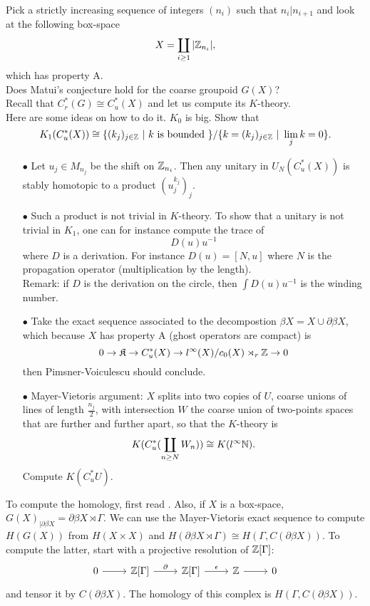 Pick a strictly increasing sequence of integers $(n_i)$ such that $n_i | n_{i+1}$ and look at the following box-space
\[X = \coprod_{i\geq 1} | \mathbb Z_{n_i}|,\]
which has property A.\\

Does Matui's conjecture hold for the coarse groupoid $G(X)$?\\ 

Recall that $C^*_r(G) \cong C_u^*(X)$ and let us compute its $K$-theory. \\

Here are some ideas on how to do it. $K_0$ is big. Show that 
\[K_1(C^*_u(X)) \cong \{ (k_j)_{j\in \Z} \ |\ k \text{ is bounded } \} /  \{ k=(k_j)_{j\in \Z} \ |\ \lim_j k =0 \}.\]
\begin{itemize}
\item[$\bullet$] Let $u_j\in M_{n_j}$ be the shift on $\mathbb Z_{n_i}$. Then any unitary in $U_N(C^*_u(X))$ is stably homotopic to a product $(u_j^{k_j})_j$.
\item[$\bullet$] Such a product is not trivial in $K$-theory. To show that a unitary is not trivial in $K_1$, one can for instance compute the trace of 
\[D(u)u^{-1}\]
where $D$ is a derivation. For instance $D(u)= [N,u]$ where $N$ is the propagation operator (multiplication by the length).\\
Remark: if $D$ is the derivation on the circle, then $\int D(u)u^{-1}$ is the winding number.  
\item[$\bullet$] Take the exact sequence associated to the decompostion $\beta X = X \cup \partial \beta X$, which because $X$ has property A (ghost operators are compact) is
\[0\rightarrow \mathfrak K \rightarrow C_u^*(X) \rightarrow l^{\infty}(X)/c_{0}(X) \rtimes_r \mathbb Z \rightarrow 0\]
then Pimsner-Voiculescu should conclude. 
\item[$\bullet$] Mayer-Vietoris argument: $X$ splits into two copies of $U$, coarse unions of lines of length $\frac{n_j}{2}$, with intersection $W$ the coarse union of two-points spaces that are further and further apart, so that the $K$-theory is 
\[K(C^*_u(\coprod_{n\geq N} W_n)) \cong K(l^\infty \mathbb N).\]
Compute $K(C_u^*U)$.
\end{itemize} 

To compute the homology, first read \cite{MatuiSurvey}. Also, if $X$ is a box-space, $G(X)_{|\partial \beta X}= \partial \beta X \rtimes \Gamma$. We can use the Mayer-Vietoris exact sequence to compute $H(G(X))$ from $H(X\times X)$ and $H(\partial \beta X \rtimes \Gamma)\cong H(\Gamma, C(\partial\beta X))$. To compute the latter, start with a projective resolution of $\mathbb Z [\Gamma]$: 
\[\begin{tikzcd} 0 \arrow{r} & \Z [\Gamma] \arrow{r}{\partial} & \Z [\Gamma] \arrow{r}{\epsilon} & \Z \arrow{r} & 0 \end{tikzcd}\]
and tensor it by $C(\partial \beta X)$. The homology of this complex is $H(\Gamma, C(\partial\beta X))$.\\

